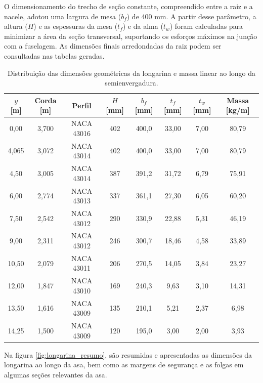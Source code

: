 O dimensionamento do trecho de seção constante, compreendido entre a raiz e a nacele, adotou uma largura de mesa ($b_f$) de 400 mm. A partir desse parâmetro, a altura ($H$) e as espessuras da mesa ($t_f$) e da alma ($t_w$) foram calculadas para minimizar a área da seção transversal, suportando os esforços máximos na junção com a fuselagem. As dimensões finais arredondadas da raiz podem ser consultadas nas tabelas geradas. 

\begin{table}[H]
    \centering
    \caption{Distribuição das dimensões geométricas da longarina e massa linear ao longo da semienvergadura.}
    \vspace{0.2cm}
    \begin{tabular}{cccccccc}
        \hline
        \textbf{$y$ [m]} & \textbf{Corda [m]} & \textbf{Perfil} & \textbf{$H$ [mm]} & \textbf{$b_f$ [mm]} & \textbf{$t_f$ [mm]} & \textbf{$t_w$ [mm]} & \textbf{Massa [kg/m]} \\
        \hline
        0,00 & 3,700 & NACA 43016 & 402 & 400,0 & 33,00 & 7,00 & 80,79 \\
        4,065 & 3,072 & NACA 43014 & 402 & 400,0 & 33,00 & 7,00 & 80,79 \\
        4,50 & 3,005 & NACA 43014 & 387 & 391,2 & 31,72 & 6,79 & 75,91 \\
        6,00 & 2,774 & NACA 43013 & 337 & 361,1 & 27,30 & 6,05 & 60,20 \\
        7,50 & 2,542 & NACA 43012 & 290 & 330,9 & 22,88 & 5,31 & 46,19 \\
        9,00 & 2,311 & NACA 43012 & 246 & 300,7 & 18,46 & 4,58 & 33,89 \\
        10,50 & 2,079 & NACA 43011 & 206 & 270,5 & 14,05 & 3,84 & 23,27 \\
        12,00 & 1,847 & NACA 43010 & 169 & 240,3 & 9,63 & 3,10 & 14,31 \\
        13,50 & 1,616 & NACA 43009 & 135 & 210,1 & 5,21 & 2,37 & 6,98 \\
        14,25 & 1,500 & NACA 43009 & 120 & 195,0 & 3,00 & 2,00 & 3,93 \\
        \hline
    \end{tabular}
    \label{tab:longarina_resultados_resumo}
\end{table}

Na figura \ref{fig:longarina_resumo}, são resumidas e apresentadas as dimensões da longarina ao longo da asa, bem como as margens de segurança e as folgas em algumas seções relevantes da asa.

